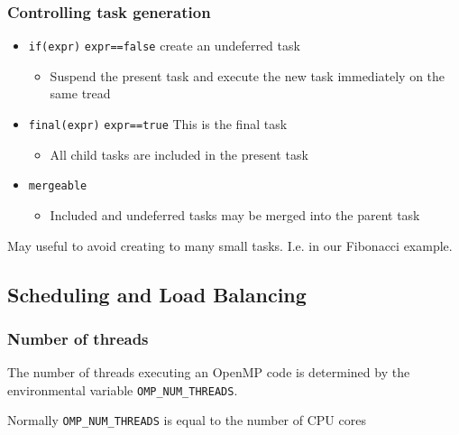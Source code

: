 \subsubsection{Controlling task
generation}\label{controlling-task-generation}

\begin{itemize}
\itemsep1pt\parskip0pt
\item
  \texttt{if(expr)} \texttt{expr==false} create an undeferred task

  \begin{itemize}
  \itemsep1pt\parskip0pt
  \item
    Suspend the present task and execute the new task immediately on the
    same tread
  \end{itemize}
\item
  \texttt{final(expr)} \texttt{expr==true} This is the final task

  \begin{itemize}
  \itemsep1pt\parskip0pt
  \item
    All child tasks are included in the present task
  \end{itemize}
\item
  \texttt{mergeable}

  \begin{itemize}
  \itemsep1pt\parskip0pt
  \item
    Included and undeferred tasks may be merged into the parent task
  \end{itemize}
\end{itemize}

May useful to avoid creating to many small tasks. I.e. in our Fibonacci
example.

\subsection{Scheduling and Load
Balancing}\label{scheduling-and-load-balancing}

\subsubsection{Number of threads}\label{number-of-threads}

The number of threads executing an OpenMP code is determined by the
environmental variable \texttt{OMP\_NUM\_THREADS}.

Normally \texttt{OMP\_NUM\_THREADS} is equal to the number of CPU cores

